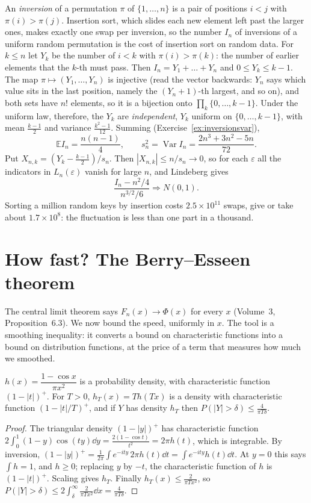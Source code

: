 \begin{example}\label{ex:inversions}
An \emph{inversion} of a permutation $\pi$ of $\{1,\dots,n\}$ is a pair of positions $i<j$ with $\pi(i)>\pi(j)$. Insertion sort, which slides each new
element left past the larger ones, makes exactly one swap per inversion, so the number $I_n$ of inversions of a uniform random permutation is the
cost of insertion sort on random data. For $k\le n$ let $Y_k$ be the number of $i<k$ with $\pi(i)>\pi(k)$: the number of earlier elements that the
$k$-th must pass. Then $I_n=Y_1+\dots+Y_n$ and $0\le Y_k\le k-1$. The map $\pi\mapsto(Y_1,\dots,Y_n)$ is injective (read the vector backwards:
$Y_n$ says which value sits in the last position, namely the $(Y_n+1)$-th largest, and so on), and both sets have $n!$ elements, so it is a
bijection onto $\prod_k\{0,\dots,k-1\}$. Under the uniform law, therefore, the $Y_k$ are \emph{independent}, $Y_k$ uniform on $\{0,\dots,k-1\}$, with
mean $\frac{k-1}2$ and variance $\frac{k^2-1}{12}$. Summing (Exercise~\ref{ex:inversionsvar}),
\[
\mathbb EI_n=\frac{n(n-1)}4,\qquad s_n^2=\operatorname{Var}I_n=\frac{2n^3+3n^2-5n}{72}.
\]
Put $X_{n,k}=(Y_k-\frac{k-1}2)/s_n$. Then $|X_{n,k}|\le n/s_n\to0$, so for each $\varepsilon$ all the indicators in $L_n(\varepsilon)$ vanish for
large $n$, and Lindeberg gives
\[
\frac{I_n-n^2/4}{n^{3/2}/6}\Rightarrow N(0,1).
\]
Sorting a million random keys by insertion costs $2.5\times10^{11}$ swaps, give or take about $1.7\times10^8$: the fluctuation is less than one part in a
thousand.
\end{example}

\section{How fast? The Berry--Esseen theorem}

The central limit theorem says $F_n(x)\to\Phi(x)$ for every $x$ (Volume~3, Proposition~6.3). We now bound the speed, uniformly in $x$. The tool is a smoothing inequality: it converts a bound on characteristic functions into a bound on distribution functions,
at the price of a term that measures how much we smoothed.

\begin{lemma}\label{lem:polya}
$h(x)=\dfrac{1-\cos x}{\pi x^2}$ is a probability density, with characteristic function $(1-|t|)^+$. For $T>0$, $h_T(x)=Th(Tx)$ is a density
with characteristic function $(1-|t|/T)^+$, and if $Y$ has density $h_T$ then $P(|Y|>\delta)\le\frac4{\pi T\delta}$.
\end{lemma}
\begin{proof}
The triangular density $(1-|y|)^+$ has characteristic function $2\int_0^1(1-y)\cos(ty)\dd y=\frac{2(1-\cos t)}{t^2}=2\pi h(t)$, which is integrable. By
inversion, $(1-|y|)^+=\frac1{2\pi}\int e^{-ity}\,2\pi h(t)\dd t=\int e^{-ity}h(t)\dd t$. At $y=0$ this says $\int h=1$, and $h\ge0$; replacing $y$ by $-t$,
the characteristic function of $h$ is $(1-|t|)^+$. Scaling gives $h_T$. Finally $h_T(x)\le\frac2{\pi Tx^2}$, so
$P(|Y|>\delta)\le2\int_\delta^\infty\frac2{\pi Tx^2}\dd x=\frac4{\pi T\delta}$.
\end{proof}

